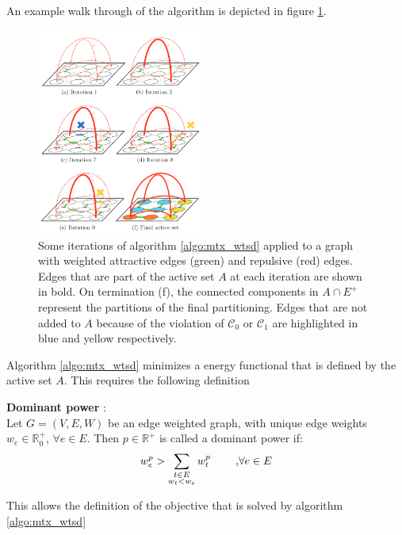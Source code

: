 An example walk through of the algorithm is depicted in figure \ref{fig_mtxwtsd1}. \\

\begin{figure}
	\centering
	\includegraphics[width=0.5\textwidth]{figures/mutexwatershed/walkthrough}
	\caption{\cite{wolf2019mutex} Some iterations of algorithm \ref{algo:mtx_wtsd} applied to a graph with weighted attractive edges (green) and repulsive (red) edges. Edges that are part of the active set $A$ at each iteration are shown in bold. On termination (f), the connected components in $A \cap E^+$ represent the partitions of the final partitioning. Edges that are not added to $A$ because of the violation of $\mathcal{C}_0$ or $\mathcal{C}_1$ are highlighted in blue and yellow respectively.}
	\label{fig_mtxwtsd1}
\end{figure}

\newpage
Algorithm \ref{algo:mtx_wtsd} minimizes a energy functional that is defined by the active set $A$. This requires the following definition
\begin{defn}
	\textbf{Dominant power} \cite{wolf2019mutex}: \\
	Let $G = (V, E, W)$ be an edge weighted graph, with unique edge weights $w_e \in \mathbb{R}_0^+$, $\forall e \in E$. Then $p \in \mathbb{R}^+$ is called a dominant power if:\\
	\begin{align}
		w_e^p > \sum_{\substack{t \in E \\ w_t < w_e}} w_t^p \text{\hspace{8mm},} \forall e \in E
	\end{align}
\end{defn}
 This allows the definition of the objective that is solved by algorithm \ref{algo:mtx_wtsd}
 
